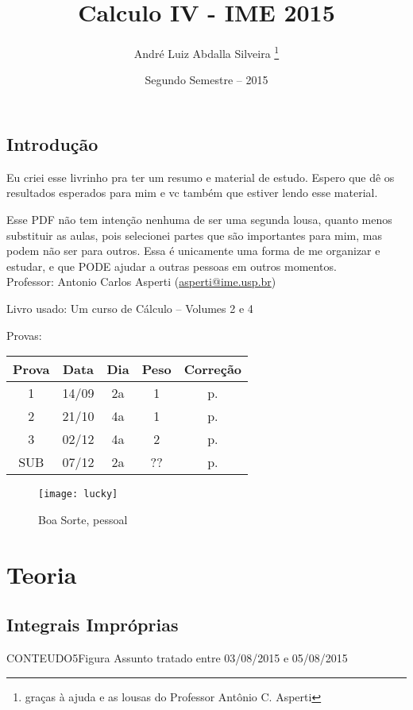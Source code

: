 \documentclass[12pt,openany, letterpaper]{book}
\title{Calculo IV - IME 2015}
\author{André Luiz Abdalla Silveira \thanks{graças à ajuda e as lousas do Professor Antônio C. Asperti}}
\date{Segundo Semestre -- 2015}
\begin{document}
\maketitle

\tableofcontents


\chapter*{Introdução}
\label{chap:c0}

\hspace{5mm} Eu criei esse livrinho pra ter um resumo e material de estudo. Espero que dê os resultados esperados para mim e vc também que estiver lendo esse material. 

Esse PDF não tem intenção nenhuma de ser uma segunda lousa, quanto menos substituir as aulas, pois selecionei partes que são importantes para mim, mas podem não ser para outros. Essa é unicamente uma forma de me organizar e estudar, e que PODE ajudar a outras pessoas em outros momentos.\\

Professor: 	Antonio Carlos Asperti (\href{mailto:asperti@ime.usp.br}{asperti@ime.usp.br})

Livro usado: Um curso de Cálculo -- Volumes 2 e 4
\vspace{10mm}

Provas:
\begin{tabular}{|c|c|c|c|c|}
\hline
 Prova & Data & Dia & Peso & Correção \\ \hline 
 1 & 14/09 & 2a & 1 &  p. \pageref{C:P1}\\ \hline
 2 & 21/10 & 4a & 1 &  p. \pageref{C:P2}\\ \hline
 3 & 02/12 & 4a & 2 &  p. \pageref{C:P3}\\ \hline
 SUB & 07/12 & 2a & ?? & p. \pageref{C:SUB} \\\hline
\end{tabular}

\begin{figure}
\centering
\texttt{[image: lucky]}
\caption{Boa Sorte, pessoal}
\label{fig:lucky}
\end{figure}


\part{Teoria}
\chapter{Integrais Impróprias}
\label{chap:c1}
CONTEUDO5Figura
\hspace{5mm} Assunto tratado entre 03/08/2015 e 05/08/2015
\end{document}
